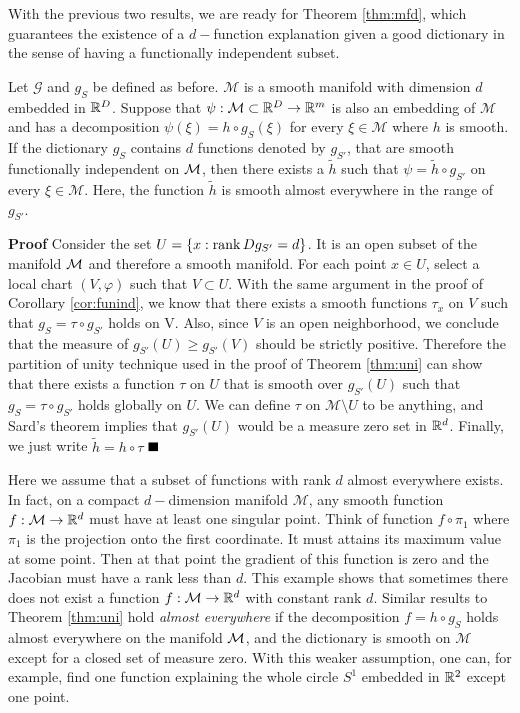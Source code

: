 With the previous two results, we are ready for Theorem \ref{thm:mfd}, which guarantees the existence of a $d-$function explanation given a good dictionary in the sense of having a functionally independent subset.
%
\begin{theorem}
\label{thm:mfd}
Let $\mathcal{G}$ and $g_S$ be defined as before. $\mathcal{M}$ is a smooth manifold with dimension $d$ embedded in ${\mathbb R}^D$. Suppose that $\psi: \mathcal{M}\subset {\mathbb R}^D \rightarrow {\mathbb R}^m$ is also an embedding of $\mathcal{M}$ and has a decomposition $\psi(\xi) = h\circ g_S(\xi)$ for every $\xi \in \mathcal{M}$ where $h$ is smooth.
If the dictionary $g_S$ contains $d$ functions denoted by $g_{S'}$,  that are smooth functionally independent on $\cal M$, then there exists a $\widetilde{h}$ such that $\psi = \widetilde{h}\circ g_{S'}$ on every $\xi \in \mathcal{M}$. Here, the
function $\widetilde{h}$ is smooth almost everywhere in the range of $g_{S'}$.
\end{theorem}

{\bf Proof}
Consider the set $U=\{x: \operatorname{rank} Dg_{S'}=d\}$. It is an open subset of the manifold $\cal M$ and therefore a smooth manifold. For each point $x\in U$, select a local chart $(V,\varphi)$ such that $V\subset U$. With the same argument in the proof of Corollary \ref{cor:funind}, we know that there exists a smooth functions $\tau_x$ on $V$ such that $g_S = \tau \circ g_{S'}$ holds on V. Also, since $V$ is an open neighborhood, we conclude that the measure of $g_{S'}(U)\geq g_{S'}(V)$ should be strictly positive. Therefore the partition of unity technique used in the proof of Theorem \ref{thm:uni} can show that there exists a function $\tau$ on $U$ that is smooth over $g_{S'}(U)$ such that $g_S = \tau \circ g_{S'}$ holds globally on $U$. We can define $\tau$ on $\mathcal{M}\setminus U$ to be anything, and Sard's theorem implies that $g_{S'}(U)$ would be a measure zero set in ${\mathbb R}^d$.  Finally, we just write $\widetilde{h}=h\circ \tau $
\hfill $\BlackBox$

Here we
assume that a subset of functions with rank $d$ almost everywhere
exists. In fact, on a compact $d-$dimension manifold $\mathcal{M}$, any smooth function $f:\mathcal{M}\rightarrow {\mathbb R}^d$ must have at least one singular point.  Think of function $f\circ \pi_1$ where $\pi_1$ is the projection onto the first coordinate. It must attains its maximum value at some point. Then at that point the gradient of this function is zero and the Jacobian must have a rank less than $d$. This example shows that sometimes there does not exist a function $f:\mathcal{M}\rightarrow {\mathbb R}^d$ with constant rank $d$. Similar results to Theorem \ref{thm:uni} hold {\em almost
everywhere} if the decomposition $f=h\circ g_S$ holds almost
  everywhere on the manifold ${\cal M}$, and the dictionary is smooth on
$\mathcal{M}$ except for a closed set of measure zero. With this
weaker assumption, one can, for example, find one function explaining
the whole circle $S^1$ embedded in ${\mathbb R}^2$ except one point.

